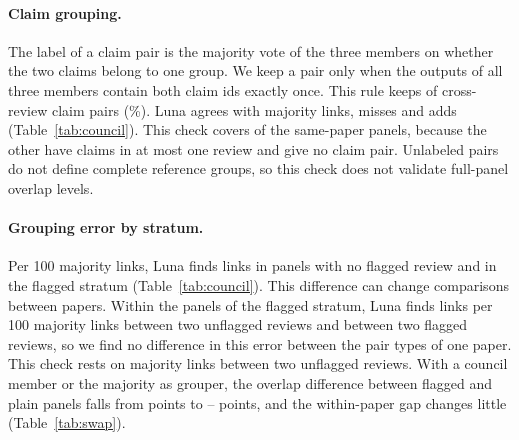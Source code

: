\documentclass[11pt]{article}
\begin{document}
\begin{table}[!htp]
\centering\footnotesize
\setlength{\tabcolsep}{3.2pt}

\caption{Luna's quotes agree with those of a council member almost as closely as the quotes of two members agree, in each detector stratum. Claims are per review. Span F1 compares the quoted words of Luna and one member, or of two members.}
\label{tab:extraction}
\end{table}


\paragraph{Claim grouping.} The label of a claim pair is the majority vote of the three members on whether the two claims belong to one group. We keep a pair only when the outputs of all three members contain both claim ids exactly once. This rule keeps \RefPairCandidates{} of \RefPairAllCandidates{} cross-review claim pairs (\RefPairCoverage\%). Luna agrees with \RefPairTp{} majority links, misses \RefPairFn{} and adds \RefPairFp{} (Table~\ref{tab:council}). This check covers \RefPairPanels{} of the \RefPipePanels{} same-paper panels, because the other \RefPairEmptyPanels{} have claims in at most one review and give no claim pair. Unlabeled pairs do not define complete reference groups, so this check does not validate full-panel overlap levels.

\paragraph{Grouping error by stratum.} Per 100 majority links, Luna finds \RefRatioPlain{} links in panels with no flagged review and \RefRatioFlagged{} in the flagged stratum (Table~\ref{tab:council}). This difference can change comparisons between papers. Within the panels of the flagged stratum, Luna finds \RefTypeRatioNone{} links per 100 majority links between two unflagged reviews and \RefTypeRatioTwo{} between two flagged reviews, so we find no difference in this error between the pair types of one paper. This check rests on \RefTypeLinksNone{} majority links between two unflagged reviews. With a council member or the majority as grouper, the overlap difference between flagged and plain panels falls from \RefSwapPanelLuna{} points to \RefSwapPanelMin{}--\RefSwapPanelMax{} points, and the within-paper gap changes little (Table~\ref{tab:swap}).

\begin{table}[!htp]
\centering\small

\caption{Luna's grouping agrees with the majority vote of the council on same-paper panels, but misses more links in panels with no flagged review. Pairs: claim pairs from different reviews of one panel with a vote from all three members. Precision, recall and F1 take the majority vote as truth. Links per 100: Luna's links per 100 majority links.}
\label{tab:council}
\end{table}
\end{document}
